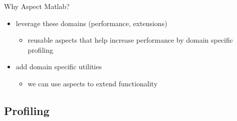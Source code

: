 \begin{frame}{Why Aspect Matlab?}
\begin{onlyenv}
\begin{itemize}
    \item leverage these domains (performance, extensions)
      \begin{itemize}
      \item reusable aspects that help increase performance
        by domain specific profiling
      \end{itemize}
    \item add domain specific utilities
      \begin{itemize}
      \item we can use aspects to extend functionality
      \end{itemize}
    \end{itemize}
  \end{onlyenv}
\end{frame}


\subsection*{Profiling}

